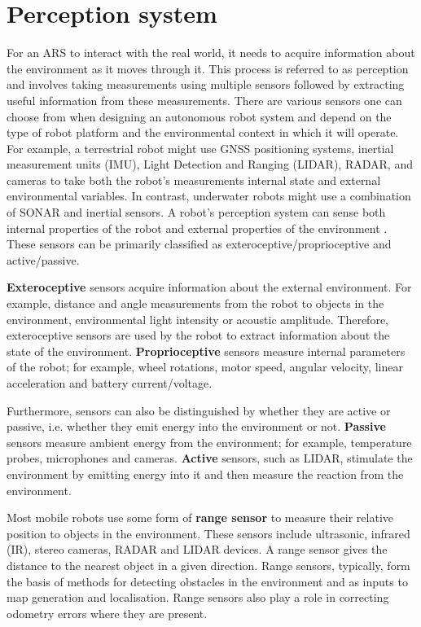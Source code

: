 \section{Perception system}
For an ARS to interact with the real world, it needs to acquire information about the environment as it moves through it. This process is referred to as perception and involves taking measurements using multiple sensors followed by extracting useful information from these measurements. There are various sensors one can choose from when designing an autonomous robot system and depend on the type of robot platform and the environmental context in which it will operate. For example, a terrestrial robot might use GNSS positioning systems, inertial measurement units (IMU), Light Detection and Ranging (LIDAR), RADAR, and cameras to take both the robot's measurements internal state and external environmental variables. In contrast, underwater robots might use a combination of SONAR and inertial sensors. A robot's perception system can sense both internal properties of the robot and external properties of the environment \cite{Siciliano2008b}. These sensors can be primarily classified as exteroceptive/proprioceptive and active/passive. 

\textbf{Exteroceptive} sensors acquire information about the external environment. For example, distance and angle measurements from the robot to objects in the environment, environmental light intensity or acoustic amplitude. Therefore, exteroceptive sensors are used by the robot to extract information about the state of the environment. \textbf{Proprioceptive} sensors measure internal parameters of the robot; for example, wheel rotations, motor speed, angular velocity, linear acceleration and battery current/voltage.

Furthermore, sensors can also be distinguished by whether they are active or passive, i.e. whether they emit energy into the environment or not. \textbf{Passive} sensors measure ambient energy from the environment; for example, temperature probes, microphones and cameras. \textbf{Active} sensors, such as LIDAR, stimulate the environment by emitting energy into it and then measure the reaction from the environment.

Most mobile robots use some form of \textbf{range sensor} to measure their relative position to objects in the environment. These sensors include ultrasonic, infrared (IR), stereo cameras, RADAR and LIDAR devices. A range sensor gives the distance to the nearest object in a given direction. Range sensors, typically, form the basis of methods for detecting obstacles in the environment and as inputs to map generation and localisation. Range sensors also play a role in correcting odometry errors where they are present.

